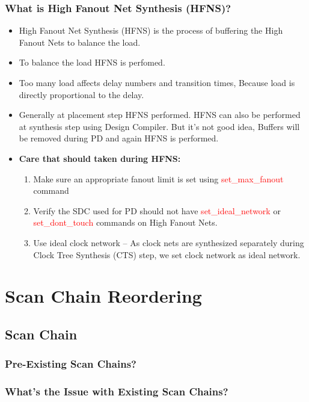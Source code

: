 \documentclass[compress]{beamer}
\begin{document}
\begin{frame}
	\frametitle{What is High Fanout Net Synthesis (HFNS)?}
	\begin{itemize}
		\item High Fanout Net Synthesis (HFNS) is the process of buffering the High Fanout Nets to balance the load.
		
		\item To balance the load HFNS is perfomed.
		\item Too many load affects delay numbers and transition times, Because load is directly proportional to the delay.
		\item Generally at placement step HFNS performed. HFNS can also be performed at synthesis step using Design Compiler. But it’s not good idea, Buffers will be removed during PD and again HFNS is performed.
		\item \textbf{Care that should taken during HFNS:}
	\begin{enumerate}
		\item Make sure an appropriate fanout limit is set using \textcolor{red}{set\_max\_fanout} command
		\item Verify the SDC used for PD should not have \textcolor{red}{set\_ideal\_network} or \textcolor{red}{set\_dont\_touch} commands on High Fanout Nets.
		\item Use ideal clock network – As clock nets are synthesized separately during Clock Tree Synthesis (CTS) step, we set clock network as ideal network.
		
	\end{enumerate}
		
	\end{itemize}
\end{frame}

\section[Scan Chain]{Scan Chain Reordering}
\subsection[Scan Chain]{Scan Chain}
\begin{frame}
	\frametitle{Pre-Existing Scan Chains?}
	\begin{center}
	\end{center}
\end{frame}

\begin{frame}
	\frametitle{What’s the Issue with Existing Scan Chains?}
	\begin{center}
	\end{center}
\end{frame}
\end{document}
